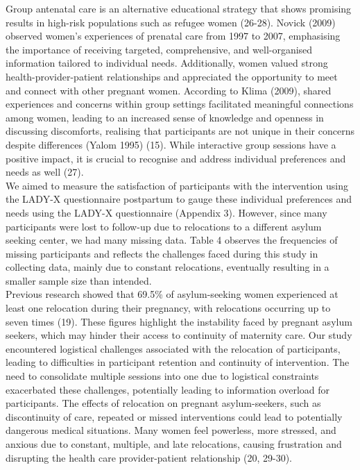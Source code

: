 \documentclass[12pt]{article}
\begin{document}
\noindent Group antenatal care is an alternative educational strategy that shows promising results in high-risk populations such as refugee women (26-28). Novick (2009) observed women's experiences of prenatal care from 1997 to 2007, emphasising the importance of receiving targeted, comprehensive, and well-organised information tailored to individual needs. Additionally, women valued strong health-provider-patient relationships and appreciated the opportunity to meet and connect with other pregnant women. According to Klima (2009), shared experiences and concerns within group settings facilitated meaningful connections among women, leading to an increased sense of knowledge and openness in discussing discomforts, realising that participants are not unique in their concerns despite differences (Yalom 1995) (15). While interactive group sessions have a positive impact, it is crucial to recognise and address individual preferences and needs as well (27). \\

\noindent We aimed to measure the satisfaction of participants with the intervention using the LADY-X questionnaire postpartum to gauge these individual preferences and needs using the LADY-X questionnaire (Appendix 3). However, since many participants were lost to follow-up due to relocations to a different asylum seeking center, we had many missing data. Table 4 observes the frequencies of missing participants and reflects the challenges faced during this study in collecting data, mainly due to constant relocations, eventually resulting in a smaller sample size than intended. \\

\noindent Previous research showed that 69.5\% of asylum-seeking women experienced at least one relocation during their pregnancy, with relocations occurring up to seven times (19). These figures highlight the instability faced by pregnant asylum seekers, which may hinder their access to continuity of maternity care. Our study  encountered logistical challenges associated with the relocation of participants, leading to difficulties in participant retention and continuity of intervention. The need to consolidate multiple sessions into one due to logistical constraints exacerbated these challenges, potentially leading to information overload for participants. The effects of relocation on pregnant asylum-seekers, such as discontinuity of care, repeated or missed interventions could lead to potentially dangerous medical situations. Many women feel powerless, more stressed, and anxious due to constant, multiple, and late relocations, causing frustration and disrupting the health care provider-patient relationship (20, 29-30). \\
\end{document}
